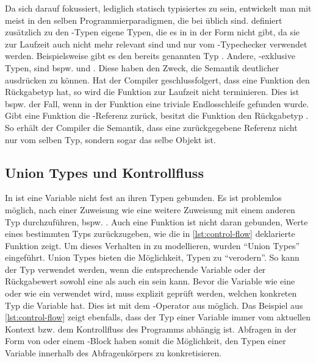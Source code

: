 \documentclass[a4paper]{scrartcl}
\begin{document}
Da sich \ts{} darauf fokussiert, lediglich statisch typisiertes \js{} zu sein, entwickelt man mit \ts{} meist in den selben Programmierparadigmen, die bei \js{} üblich sind.
\ts{} definiert zusätzlich zu den \js-Typen eigene Typen, die es in \js{} in der Form nicht gibt, da sie zur Laufzeit auch nicht mehr relevant sind und nur vom \ts-Typechecker verwendet werden.
Beispielsweise gibt es den bereits genannten Typ \tsany{}.
Andere, \ts-exklusive Typen, sind bspw.  und .
Diese haben den Zweck, die Semantik deutlicher ausdrücken zu können.
Hat der Compiler geschlussfolgert, dass eine Funktion den Rückgabetyp  hat, so wird die Funktion zur Laufzeit nicht terminieren.
Dies ist bspw. der Fall, wenn in der Funktion eine triviale Endlosschleife gefunden wurde.
Gibt eine Funktion die \tsthis-Referenz zurück, besitzt die Funktion den Rückgabetyp \tsthis{}.
So erhält der Compiler die Semantik, dass eine zurückgegebene Referenz nicht nur vom selben Typ, sondern sogar das selbe Objekt ist.


\subsection{Union Types und Kontrollfluss}\label{union-types}
In \js{} ist eine Variable nicht fest an ihren Typen gebunden.
Es ist problemlos möglich, nach einer Zuweisung wie  eine weitere Zuweisung mit einem anderen Typ durchzuführen, bspw. .
Auch eine Funktion ist nicht daran gebunden, Werte eines bestimmten Typs zu\-rück\-zu\-ge\-ben, wie die in \autoref{lst:control-flow} deklarierte Funktion zeigt.
Um dieses Verhalten in \ts{} zu modellieren, wurden \enquote{Union Types} eingeführt.
Union Types bieten die Möglichkeit, Typen zu \enquote{verodern}.
So kann der Typ  verwendet werden, wenn die entsprechende Variable oder der Rückgabewert sowohl eine \tsnumber{} als auch ein \tsstring{} sein kann.
Bevor die Variable wie eine \tsnumber{} oder wie ein \tsstring{} verwendet wird, muss explizit geprüft werden, welchen konkreten Typ die Variable hat.
Dies ist mit dem \tstypeof-Operator aus \js{} möglich.
Das Beispiel aus \autoref{lst:control-flow} zeigt ebenfalls, dass der Typ einer Variable immer vom aktuellen Kontext bzw. dem Kontrollfluss des Programms abhängig ist.
Abfragen in der Form von \tsif{} oder einem \tsswitch-Block haben somit die Möglichkeit, den Typen einer Variable innerhalb des Abfragenkörpers zu konkretisieren.
\end{document}
